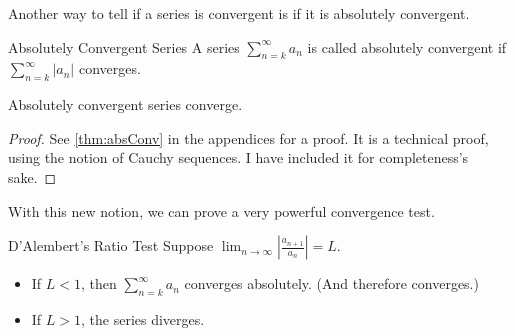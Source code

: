 Another way to tell if a series is convergent is if it is absolutely convergent.

\begin{defbo}{Absolutely Convergent Series}{} A series $\sum_{n = k}^\infty a_n$ is called absolutely convergent if $\sum_{n = k}^\infty |a_n|$ converges.\end{defbo}

\begin{thmbo}{}{}Absolutely convergent series converge.\end{thmbo}

\begin{proof} See \ref{thm:absConv} in the appendices for a proof. It is a technical proof, using the notion of Cauchy sequences. I have included it for completeness's sake.\end{proof}

With this new notion, we can prove a very powerful convergence test.

\begin{thmbo}{D'Alembert's Ratio Test}{} Suppose $\displaystyle\lim_{n\rightarrow \infty} \left| \frac{a_{n+1}}{a_n}\right| = L$.
\begin{itemize}
\item If $L < 1$, then $\sum_{n = k}^\infty a_n$ converges absolutely. (And therefore converges.)

\item If $L > 1$, the series diverges.
\end{itemize}
\end{thmbo}
 
